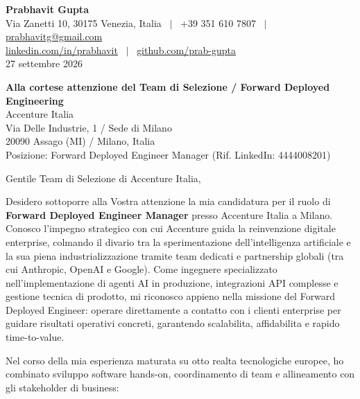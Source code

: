 \documentclass[10.5pt,a4paper]{article}
\begin{document}
\textbf{\large Prabhavit Gupta}\\
Via Zanetti 10, 30175 Venezia, Italia ~$\vert$~ +39 351 610 7807 ~$\vert$~ \href{mailto:prabhavitg@gmail.com}{prabhavitg@gmail.com}\\
\href{https://www.linkedin.com/in/prabhavit/}{linkedin.com/in/prabhavit} ~$\vert$~ \href{https://github.com/prab-gupta}{github.com/prab-gupta}\\
27 settembre 2026

\textbf{Alla cortese attenzione del Team di Selezione / Forward Deployed Engineering}\\
Accenture Italia\\
Via Delle Industrie, 1 / Sede di Milano\\
20090 Assago (MI) / Milano, Italia\\
Posizione: Forward Deployed Engineer Manager (Rif. LinkedIn: 4444008201)

Gentile Team di Selezione di Accenture Italia,

Desidero sottoporre alla Vostra attenzione la mia candidatura per il ruolo di \textbf{Forward Deployed Engineer Manager} presso Accenture Italia a Milano. Conosco l'impegno strategico con cui Accenture guida la reinvenzione digitale enterprise, colmando il divario tra la sperimentazione dell'intelligenza artificiale e la sua piena industrializzazione tramite team dedicati e partnership globali (tra cui Anthropic, OpenAI e Google). Come ingegnere specializzato nell'implementazione di agenti AI in produzione, integrazioni API complesse e gestione tecnica di prodotto, mi riconosco appieno nella missione del Forward Deployed Engineer: operare direttamente a contatto con i clienti enterprise per guidare risultati operativi concreti, garantendo scalabilita, affidabilita e rapido time-to-value.

Nel corso della mia esperienza maturata su otto realta tecnologiche europee, ho combinato sviluppo software hands-on, coordinamento di team e allineamento con gli stakeholder di business:
\end{document}
